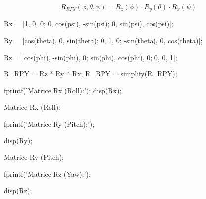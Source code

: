 \documentclass[11pt, a4paper]{article}
\begin{document}
\[
    R_{RPY} (\phi ,\theta ,\psi )=R_z (\phi )\cdot R_y (\theta )\cdot R_x (\psi )
\]

\newpage
\begin{matlabcode}
Rx = [1, 0,        0;
      0, cos(psi), -sin(psi);
      0, sin(psi), cos(psi)];

Ry = [cos(theta),  0, sin(theta);
      0,           1, 0;
      -sin(theta), 0, cos(theta)];

Rz = [cos(phi), -sin(phi), 0;
      sin(phi), cos(phi),  0;
      0,        0,         1];

R_RPY = Rz * Ry * Rx;
R_RPY = simplify(R_RPY);

fprintf('Matrice Rx (Roll):');
disp(Rx);
\end{matlabcode}
\begin{matlaboutput}
Matrice Rx (Roll):
\end{matlaboutput}
\begin{matlabcode}
fprintf('Matrice Ry (Pitch):');

disp(Ry);
\end{matlabcode}
\begin{matlaboutput}
Matrice Ry (Pitch):
\end{matlaboutput}
\begin{matlabcode}
fprintf('Matrice Rz (Yaw):');

disp(Rz);
\end{matlabcode}
\end{document}
